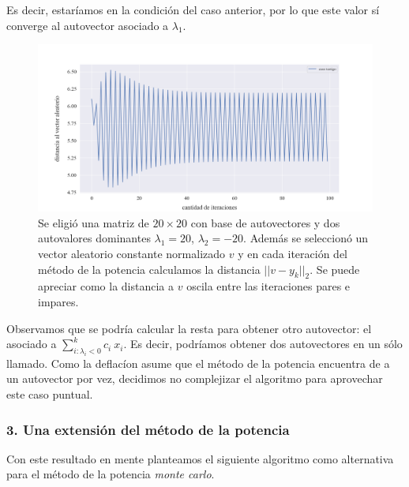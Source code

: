 \vspace{1em}
Es decir, estaríamos en la condición del caso anterior, por lo que este valor sí converge al autovector asociado a $\lambda_1$.

\begin{figure}[!htbp]
    \includegraphics[scale=0.45]{files/src/.media/op_oscilante.png}
    \caption{Se eligió una matriz de $20 \times 20$ con base de autovectores y dos autovalores dominantes $\lambda_1 = 20$, $\lambda_2 = -20$. Además se seleccionó un vector aleatorio constante normalizado $v$ y en cada iteración del método de la potencia calculamos la distancia $||v - y_k||_2$. Se puede apreciar como la distancia a $v$ oscila entre las iteraciones pares e impares.}
    \label{fig:oscilante}
\end{figure}

\vspace{1em}

\vspace{1em}
Observamos que se podría calcular la resta para obtener otro autovector: el asociado a $\sum_{i: \lambda_i < 0}^{k} c_i\ x_i$. Es decir, podríamos obtener dos autovectores en un sólo llamado. Como la deflacíon asume que el método de la potencia encuentra de a un autovector por vez, decidimos no complejizar el algoritmo para aprovechar este caso puntual.


\vspace{2em}
\subsubsection*{3. Una extensión del método de la potencia} Con este resultado en mente planteamos el siguiente algoritmo como alternativa para el método de la potencia \textit{monte carlo}.

\vspace{1em}


